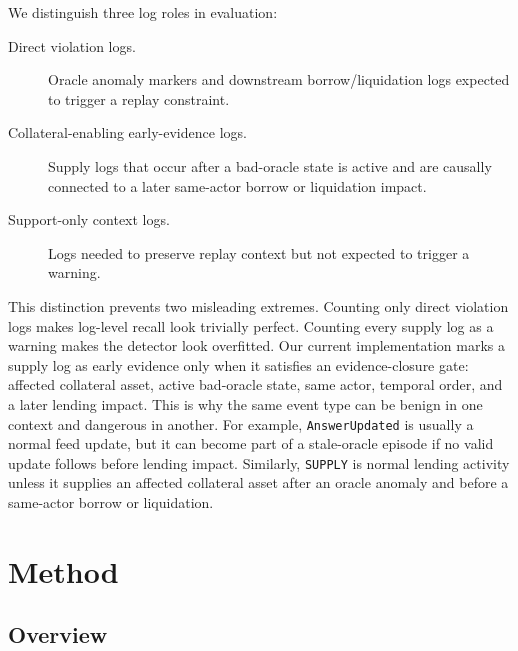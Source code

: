 \documentclass[final,5p]{elsarticle}
\newcommand{\code}[1]{\texttt{#1}}
\begin{document}
We distinguish three log roles in evaluation:
\begin{description}
    \item[Direct violation logs.] Oracle anomaly markers and downstream borrow/liquidation logs expected to trigger a replay constraint.
    \item[Collateral-enabling early-evidence logs.] Supply logs that occur after a bad-oracle state is active and are causally connected to a later same-actor borrow or liquidation impact.
    \item[Support-only context logs.] Logs needed to preserve replay context but not expected to trigger a warning.
\end{description}
This distinction prevents two misleading extremes.
Counting only direct violation logs makes log-level recall look trivially perfect.
Counting every supply log as a warning makes the detector look overfitted.
Our current implementation marks a supply log as early evidence only when it satisfies an evidence-closure gate: affected collateral asset, active bad-oracle state, same actor, temporal order, and a later lending impact.
This is why the same event type can be benign in one context and dangerous in another.
For example, \code{AnswerUpdated} is usually a normal feed update, but it can become part of a stale-oracle episode if no valid update follows before lending impact.
Similarly, \code{SUPPLY} is normal lending activity unless it supplies an affected collateral asset after an oracle anomaly and before a same-actor borrow or liquidation.

\section{Method}
\label{sec:method}

\subsection{Overview}
\end{document}
